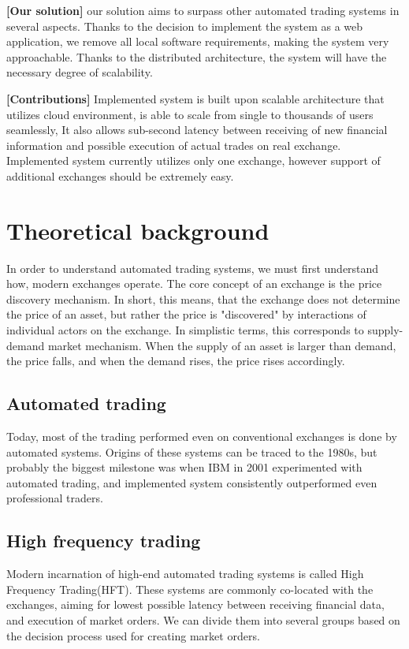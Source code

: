 \documentclass{ExcelAtFIT}
\begin{document}
    \textbf{[Our solution]} our solution aims to surpass other automated trading systems in several aspects.
    Thanks to the decision to implement the system as a web application, we remove all local software requirements, making
    the system very approachable. Thanks to the distributed architecture, the system will have the necessary degree of scalability.

    \textbf{[Contributions]} Implemented system is built upon scalable architecture that utilizes cloud environment, is able to scale from single to thousands of users seamlessly,
    It also allows sub-second latency between receiving of new financial information and possible execution of actual trades on real exchange.
    Implemented system currently utilizes only one exchange, however support of additional exchanges should be extremely easy.

    \section{Theoretical background}
    In order to understand automated trading systems, we must first understand how, modern exchanges operate.
    The core concept of an exchange is the price discovery mechanism. In short, this means, that the exchange does not determine the price of an asset, but
    rather the price is  "discovered" by interactions of individual actors on the exchange.
    In simplistic terms, this corresponds to supply-demand market mechanism. When the supply of an asset is larger
    than demand, the price falls, and when the demand rises, the price rises accordingly.

    \subsection{Automated trading}
    Today, most of the trading performed even on conventional exchanges is done by automated systems. Origins of these systems can be traced to the 1980s, but probably the
    biggest milestone was when IBM in 2001\cite{Tesauro:2001:HBA:501158.501183} experimented with automated trading, and implemented system consistently outperformed even professional traders.

    \subsection{High frequency trading}
    Modern incarnation of high-end automated trading systems is called High Frequency Trading(HFT). These systems are commonly co-located with the exchanges, aiming for lowest possible latency
    between receiving financial data, and execution of market orders. We can divide them into several groups based on the decision process used for creating market orders.
\end{document}
